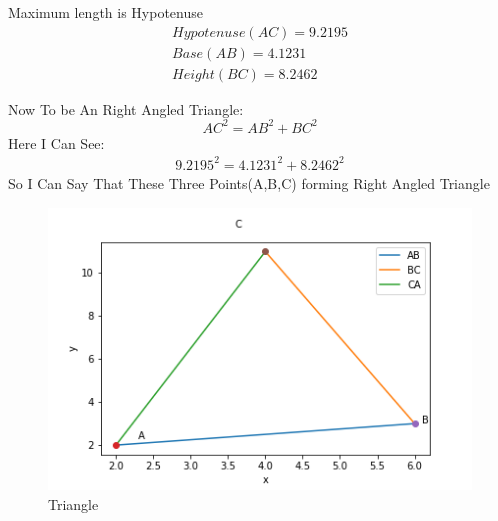 \documentclass[journal,12pt,twocolumn]{IEEEtran}
\begin{document}
Maximum length is Hypotenuse
\begin{align}
Hypotenuse(AC)=9.2195\\
Base(AB)=4.1231 \\
Height(BC)=8.2462
\end{align}

Now To be An Right Angled Triangle:
\begin{equation}
    AC^2=AB^2+BC^2
\end{equation}
Here I Can See:
\begin{align}
    9.2195^2 = 4.1231^2+8.2462^2
\end{align}
So I Can Say That These Three Points(A,B,C)  forming Right Angled Triangle
\begin{figure}[!ht]
    \centering
    \includegraphics[width=\columnwidth]{Triangle.png}
    \caption{Triangle}
\end{figure}
\end{document}
